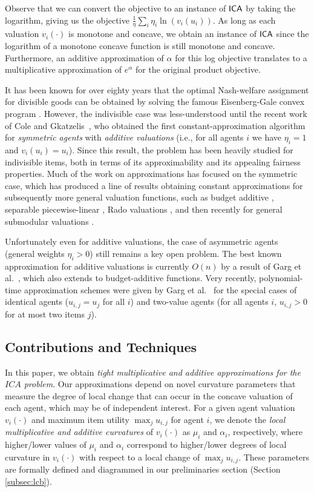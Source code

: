 Observe that we can convert the objective to an instance of $\mathsf{ICA}$ by taking the logarithm, giving us the objective $\frac{1}{\eta}\sum_i \eta_i\ln(v_i(u_i))$. As long as each valuation $v_i(\cdot)$ is monotone and concave, we obtain an instance of $\mathsf{ICA}$ since the logarithm of a monotone concave function is still monotone and concave. Furthermore, an additive approximation of $\alpha$ for this log objective translates to a multiplicative approximation of $e^{\alpha}$ for the original product objective.


It has been known for over eighty years that the optimal Nash-welfare assignment for divisible goods can be obtained by solving the famous Eisenberg-Gale convex program \cite{eisenberg1959consensus}. 
However, the indivisible case was less-understood until the recent work of Cole and Gkatzelis~\cite{cole2015approximating}, who obtained the first constant-approximation algorithm for {\em symmetric agents} with {\em additive valuations} (i.e., for all agents $i$ we have $\eta_i =1$ and  $v_i(u_i) = u_i$).
Since this result, the problem has been heavily studied for indivisible items, both in terms of its approximability and its appealing fairness properties. 
Much of the work on approximations has focused on the symmetric  case, which  has produced a line of results obtaining constant approximations for subsequently more general valuation functions, such as budget additive \cite{garg2018approximating}, separable piecewise-linear \cite{anari2018nash}, Rado valuations \cite{garg2021approximating}, and then recently for general submodular valuations \cite{li2021constant}. 


Unfortunately even for additive valuations, the case of asymmetric agents (general weights $\eta_i > 0$) still remains a key open problem. The best known approximation for additive valuations is currently $O(n)$ by a result of Garg et al.~\cite{garg2001approximation}, which also extends to budget-additive functions. Very recently, polynomial-time approximation schemes were given by Garg et al.~\cite{garg2021tractable} for the special cases of identical agents ($u_{i,j} = u_j$ for all $i$) and two-value agents (for all agents $i$, $u_{i,j} > 0$ for at most two items $j$).




\subsection{Contributions and Techniques} 
In this paper, we obtain {\em tight multiplicative and additive approximations for the $ICA$ problem}.
Our approximations depend on novel curvature parameters that measure the degree of local change that can occur in the concave valuation of each agent, which may be of independent interest. 
For a given agent valuation  $v_i(\cdot)$ and maximum item utility  $\max_{j}u_{i,j}$ for agent $i$, we denote the {\em local multiplicative and additive curvatures} of $v_i(\cdot)$ as $\mu_i$ and $\alpha_i$, respectively, where higher/lower values of $\mu_i$ and $\alpha_i$ correspond to higher/lower degrees of local curvature  in $v_i(\cdot)$ with respect to a local change of $\max_{j}u_{i,j}$.
These parameters are formally defined and diagrammed in our preliminaries section (Section \ref{subsec:lcb}). 

